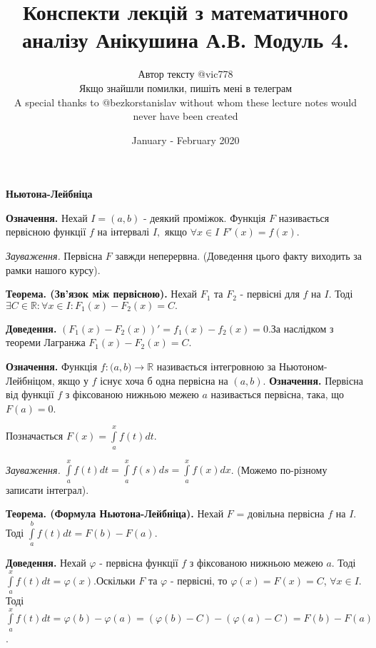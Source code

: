 \documentclass[12pt]{report}
\title{Конспекти лекцій з математичного аналізу Анікушина А.В. Модуль 4.}
\author{Автор тексту @vic778 \\ Якщо знайшли помилки, пишіть мені в телеграм \\  \small{A special thanks to @bezkorstanislav without whom these lecture notes would never have been created}}
\date{January - February 2020}
\begin{document}
	
	\maketitle
	
	\begin{center}
		\textbf{ Ньютона-Лейбніца} 
	\end{center}

	\textbf{Означення.} Нехай $I=(a,b)$ - деякий проміжок. Функція $F$ називається первісною  функції $f$ на інтервалі $I,$ якщо $\forall x \in I$ $F'(x) = f(x).$

	\vspace{3mm}
	
	\textit{Зауваження.} Первісна $F$ завжди неперервна. (Доведення цього факту виходить за рамки нашого курсу).
	
	\vspace{3mm}
	
	\textbf{Теорема. (Зв'язок між первісною).} Нехай $F_1$ та $F_2$  - первісні для $f$ на $I$. Тоді $\exists C \in \mathbb{R} : \forall x \in I: F_1(x) - F_2(x) = C.$
	
	\textbf{Доведення.} $(F_1(x) - F_2(x))' = f_1(x) - f_2(x) = 0.$За наслідком з теореми Лагранжа $F_1(x) - F_2(x) = C.$ 
	
	\vspace{3mm}
	\textbf{Означення.} Функція $ f : \mathbb(a,b) \to \mathbb{R}$ називається інтегровною за Ньютоном-Лейбніцом, якщо у $f$ існує хоча б одна первісна на 
	$(a,b)$.
	\textbf{Означення.} Первісна від функції $f$ з фіксованою нижньою межею $a$ називається первісна, така, що $F(a) = 0$.

	Позначається $F(x)=\int\limits_a^x f(t)dt$.
	\vspace{3mm}
	
	\textit{Зауваження.}  $\int\limits_a^x f(t)dt=\int\limits_a^x f(s)ds= \int\limits_a^x f(x)dx$.
	(Можемо по-різному записати інтеграл).
	
	\vspace{5mm}
	
	\textbf{Теорема. (Формула Ньютона-Лейбніца).} Нехай $F$ = довільна первісна $f$ на $I$. Тоді $\int\limits_a^b f(t)dt = F(b) - F(a)$.
	
	\textbf{Доведення.} Нехай $\varphi$ - первісна функції $f$ з фіксованою нижньою межею $a$. Тоді $\int\limits_a^x f(t)dt = \varphi(x)$.Оскільки $F$ та $\varphi$ - первісні, то $\varphi(x) =  F(x) = C$, $\forall x \in I$. Тоді $\int\limits_a^x f(t)dt = \varphi(b) - \varphi(a) =(\varphi(b) - C) - (\varphi(a) - C) = F(b) - F(a)$.
	
\end{document}
